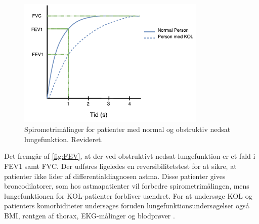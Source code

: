 \begin{figure} [H]
\centering
\includegraphics[width=0.8\textwidth]{figures/FEV}
\caption{Spirometrimålinger for patienter med normal og obstruktiv nedsat lungefunktion. Revideret\cite{Basisbogen2016}.}
\label{fig:FEV}
\end{figure} 

\noindent
Det fremgår af \autoref{fig:FEV}, at der ved obstruktivt nedsat lungefunktion er et fald i FEV1 samt FVC. Der udføres ligeledes en reversibilitetstest for at sikre, at patienter ikke lider af differentialdiagnosen astma. Disse patienter gives broncodilatorer, som hos astmapatienter vil forbedre spirometrimålingen, mens lungefunktionen for KOL-patienter forbliver uændret.\cite{Basisbogen2016, Sundhed2013} 
For at undersøge KOL og patienters komorbiditeter undersøges foruden lungefunktionsundersøgelser også BMI, røntgen af thorax, EKG-målinger og blodprøver \cite{Sundhed2013}. 
